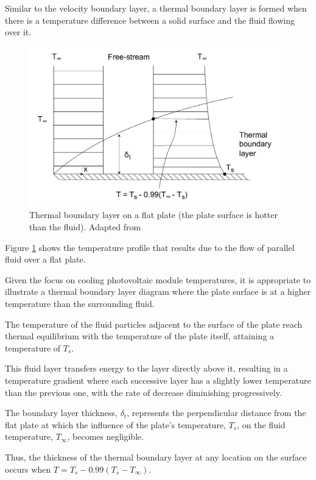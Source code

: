 Similar to the velocity boundary layer, a thermal boundary layer is formed when there is a temperature difference between a solid surface and the fluid flowing over it.\par

\begin{figure}[ht]
    \centering
    \includegraphics[width=0.75\linewidth]{Figures/thermal_boundary_layer.pdf}
    \caption{Thermal boundary layer on a flat plate (the plate surface is hotter than the fluid). Adapted from \cite{Cengel2014FundamentalsConvection}}
    \label{fig:thermal_boundary_layer}
\end{figure}

Figure \ref{fig:thermal_boundary_layer} shows the temperature profile that results due to the flow of parallel fluid over a flat plate.\par
Given the focus on cooling photovoltaic module temperatures, it is appropriate to illustrate a thermal boundary layer diagram where the plate surface is at a higher temperature than the surrounding fluid.\vspace{0.5em}

The temperature of the fluid particles adjacent to the surface of the plate reach thermal equilibrium with the temperature of the plate itself, attaining a temperature of $T_s$.\par
This fluid layer transfers energy to the layer directly above it, resulting in a temperature gradient where each successive layer has a slightly lower temperature than the previous one, with the rate of decrease diminishing progressively.\vspace{0.5em}

The boundary layer thickness, $\delta_t$, represents the perpendicular distance from the flat plate at which the influence of the plate's temperature, $T_s$, on the fluid temperature, $T_\infty$, becomes negligible.\par
Thus, the thickness of the thermal boundary layer at any location on the surface occurs when $T = T_s-0.99(T_s-T_\infty)$.\par

